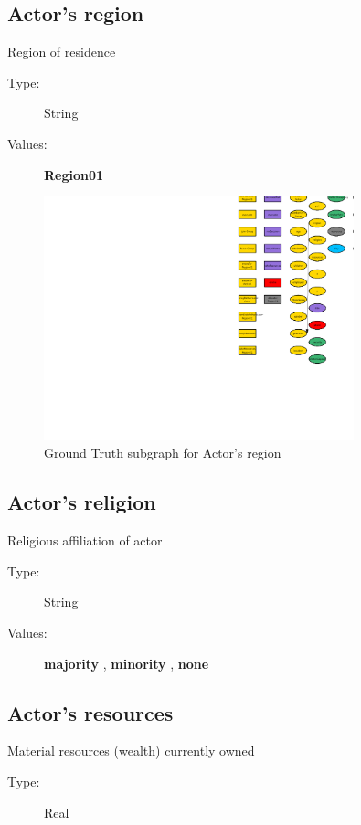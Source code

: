 \documentclass{article}%
\begin{document}
%
\subsection{Actor's region}%
\label{subsec:Actor's region}%
Region of residence%
\begin{description}%
\item[Type:]%
String%
\item[Values:]%
\textbf{Region01}%
\end{description}%


\begin{figure}[ht]%
\centering%
\includegraphics[width=0.8\textwidth]{images/regionOfActor.png}%
\caption{Ground Truth subgraph for Actor's region}%
\end{figure}

%
\subsection{Actor's religion}%
\label{subsec:Actor's religion}%
Religious affiliation of actor%
\begin{description}%
\item[Type:]%
String%
\item[Values:]%
\textbf{majority}%
, %
\textbf{minority}%
, %
\textbf{none}%
\end{description}

%
\subsection{Actor's resources}%
\label{subsec:Actor's resources}%
Material resources (wealth) currently owned%
\begin{description}%
\item[Type:]%
Real%
\end{description}%
\end{document}
